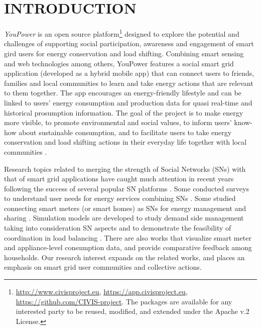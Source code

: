 \section{\uppercase{Introduction}}
\label{sec:introduction}

\noindent 
\textit{YouPower} is an open source platform\footnote{\url{http://www.civisproject.eu}, \url{https://app.civisproject.eu}, \url{https://github.com/CIVIS-project}. The packages are available for any
interested party to be reused, modified, and extended under the Apache v.2 License.} designed to explore the potential and challenges of supporting social participation, awareness and engagement of smart gird users for energy conservation and load shifting. Combining smart sensing and web technologies among others,
YouPower features a social smart grid application (developed as a hybrid mobile app) that can connect users to friends, families and local communities to learn and take energy actions that are relevant to them together. The app encourages an energy-friendly lifestyle and can be linked to users' energy consumption and production data for quasi real-time and historical prosumption information. 
% 
The goal of the project is to make energy more visible, to promote environmental and social values, to inform users' know-how about sustainable consumption, and to facilitate users to take energy conservation and load shifting actions in their everyday life together with local communities \cite{Huang2014,Huang2015a,Huang2016}. 
%  

Research topics related to merging the strength of Social Networks (SNs) with that of smart grid applications have caught much attention in recent years following the success of several popular SN platforms \cite{Boslet2010,Chima2011,Erickson2012,Fang2013,Huang2015}. 
% 
Some conducted surveys to understand user needs for energy services combining SNs \cite{Silva2012}. Some studied connecting smart meters (or smart homes) as SNs for
energy management and sharing \cite{Ciuciu2012,Steinheimer2012}. 
Simulation models are developed to study demand side management %
taking into consideration SN aspects \cite{De-Haan2011,Lei2012,Chatzidimitriou2013} and to demonstrate the feasibility of
coordination in load balancing \cite{Worm2013,Skopik2014}. There are also works that visualize smart meter and appliance-level consumption data, and provide comparative feedback among households\cite{Petkov2011,Weiss2012,Dillahunt2014}.
% 
Our research interest expands on the related works, and places an emphasis on smart grid user communities and collective actions. 

